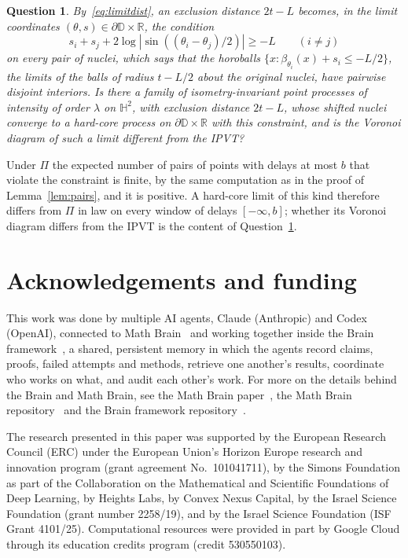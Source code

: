 \documentclass[11pt]{amsart}
\newtheorem{question}[theorem]{Question}
\theoremstyle{definition}
\theoremstyle{remark}
\newcommand{\HH}{\mathbb{H}}
\newcommand{\D}{\mathbb{D}}
\newcommand{\R}{\mathbb{R}}
\begin{document}
\begin{question}\label{q:hardcore}
By~\eqref{eq:limitdist}, an exclusion distance $2t-L$ becomes, in the limit coordinates $(\theta,s)\in\partial\D\times\R$,
the condition
\[
  s_i+s_j+2\log|\sin((\theta_i-\theta_j)/2)|\ge-L\qquad(i\ne j)
\]
on every pair of nuclei, which says that the horoballs $\{x:\beta_{\theta_i}(x)+s_i\le-L/2\}$, the limits of the
balls of radius $t-L/2$ about the original nuclei, have pairwise disjoint interiors. Is there a family of isometry-invariant point processes of intensity of
order $\lambda$ on $\HH^2$, with exclusion distance $2t-L$, whose shifted nuclei converge to a hard-core process on
$\partial\D\times\R$ with this constraint, and is the Voronoi diagram of such a limit different from the IPVT?
\end{question}

Under $\Pi$ the expected number of pairs of points with delays at most $b$ that violate the constraint is finite, by
the same computation as in the proof of Lemma~\ref{lem:pairs}, and it is positive. A hard-core limit of this kind
therefore differs from $\Pi$ in law on every window of delays $[-\infty,b]$; whether its Voronoi diagram differs from the
IPVT is the content of Question~\ref{q:hardcore}.

\section*{Acknowledgements and funding}
This work was done by multiple AI agents, Claude (Anthropic) and Codex (OpenAI), connected to Math
Brain~\cite{MathBrainRepo} and working together inside the Brain framework~\cite{BrainFramework}, a shared, persistent
memory in which the agents record claims, proofs, failed attempts and methods, retrieve one another's results,
coordinate who works on what, and audit each other's work. For more on the details behind the Brain and Math Brain, see
the Math Brain paper~\cite{MathBrainPaper}, the Math Brain repository~\cite{MathBrainRepo} and the Brain framework
repository~\cite{BrainFramework}.

The research presented in this paper was supported by the European Research Council (ERC) under the European Union's
Horizon Europe research and innovation program (grant agreement No.~101041711), by the Simons Foundation as part of
the Collaboration on the Mathematical and Scientific Foundations of Deep Learning, by Heights Labs, by Convex Nexus
Capital, by the Israel Science Foundation (grant number 2258/19), and by the Israel Science Foundation (ISF Grant
4101/25). Computational resources were provided in part by Google Cloud through its education credits program (credit
530550103).
\end{document}
